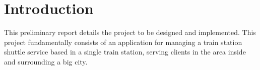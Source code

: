 \chapter{Introduction}
This preliminary report details the project to be designed and implemented.
This project fundamentally consists of an application for managing a train station shuttle service based in a single train station, serving clients in the area inside and surrounding a big city.
